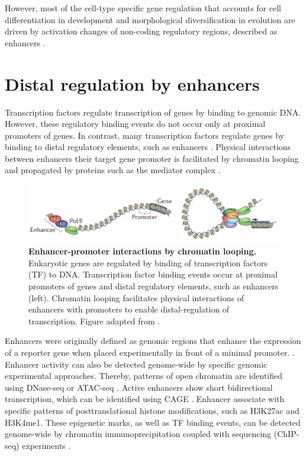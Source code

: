 \documentclass[a4paper,twoside=true,openright,parskip=full,chapterprefix=true,11pt,headings=normal,bibliography=totoc,listof=totoc,titlepage=on,captions=tableabove,draft=false]{scrreprt}
\theoremstyle{definition}
\theoremstyle{definition}
\theoremstyle{definition}
\theoremstyle{remark}
\begin{document}
However, most of the cell-type specific gene regulation that accounts
for cell differentiation in development and morphological
diversification in evolution are driven by activation changes of
non-coding regulatory regions, described as enhancers \citep{Long2016}.

\hypertarget{distal-regulation-by-enhancers}{%
\section{Distal regulation by
enhancers}\label{distal-regulation-by-enhancers}}

Transcription factors regulate transcription of genes by binding to
genomic DNA. However, these regulatory binding events do not occur only
at proximal promoters of genes. In contrast, many transcription factors
regulate genes by binding to distal regulatory elements, such as
enhancers \citep{Spitz2012}. Physical interactions between enhancers
their target gene promoter is facilitated by chromatin looping and
propagated by proteins such as the mediator complex \citep{Andrey2017}.

\begin{figure}

{\centering \includegraphics[width=0.8\linewidth]{figures/Pombo2015fig1a} 

}

\caption{\textbf{Enhancer-promoter interactions by
chromatin looping.} Eukaryotic genes are regulated by binding of
transcription factors (TF) to DNA. Transcription factor binding events
occur at proximal promoters of genes and distal regulatory elements,
such as enhancers (left). Chromatin looping facilitates physical
interactions of enhancers with promoters to enable distal-regulation of
transcription. Figure adapted from \citep{Pombo2015}.}\label{fig:EnhancerLooping}
\end{figure}









Enhancers were originally defined as genomic regions that enhance the
expression of a reporter gene when placed experimentally in front of a
minimal promoter. \citep{Banerji1981, Shlyueva2014}. Enhancer activity
can also be detected genome-wide by specific genomic experimental
approaches. Thereby, patterns of open chromatin are identified using
DNase-seq \citep{Song2010} or ATAC-seq \citep{Buenrostro2013}. Active
enhancers show short bidirectional transcription, which can be
identified using CAGE \citep{Andersson2014}. Enhancer associate with
specific patterns of posttranslational histone modifications, such as
H3K27ac and H3K4me1. These epigenetic marks, as well as TF binding
events, can be detected genome-wide by chromatin immunoprecipitation
coupled with sequencing (ChIP-seq) experiments \citep{Creyghton2010}.
\end{document}
